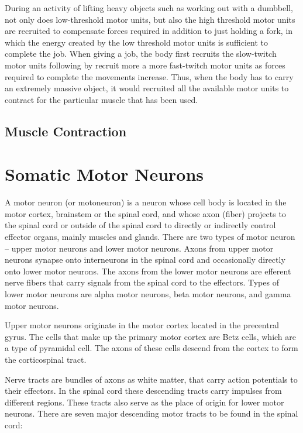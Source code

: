 During an activity of lifting heavy objects such as working out with a dumbbell, not only does low-threshold motor units, but also the high threshold motor units are recruited to compensate forces required in addition to just holding a fork, in which the energy created by the low threshold motor units is sufficient to complete the job. When giving a job, the body first recruits the slow-twitch motor units following by recruit more a more fast-twitch motor units as forces required to complete the movements increase. Thus, when the body has to carry an extremely massive object, it would recruited all the available motor units to contract for the particular muscle that has been used.

\hypertarget{muscle-contraction}{%
\subsection{Muscle Contraction}\label{muscle-contraction}}

\hypertarget{somatic-motor-neurons}{%
\section{Somatic Motor Neurons}\label{somatic-motor-neurons}}

A motor neuron (or motoneuron) is a neuron whose cell body is located in the motor cortex, brainstem or the spinal cord, and whose axon (fiber) projects to the spinal cord or outside of the spinal cord to directly or indirectly control effector organs, mainly muscles and glands. There are two types of motor neuron -- upper motor neurons and lower motor neurons. Axons from upper motor neurons synapse onto interneurons in the spinal cord and occasionally directly onto lower motor neurons. The axons from the lower motor neurons are efferent nerve fibers that carry signals from the spinal cord to the effectors. Types of lower motor neurons are alpha motor neurons, beta motor neurons, and gamma motor neurons.

Upper motor neurons originate in the motor cortex located in the precentral gyrus. The cells that make up the primary motor cortex are Betz cells, which are a type of pyramidal cell. The axons of these cells descend from the cortex to form the corticospinal tract.

Nerve tracts are bundles of axons as white matter, that carry action potentials to their effectors. In the spinal cord these descending tracts carry impulses from different regions. These tracts also serve as the place of origin for lower motor neurons. There are seven major descending motor tracts to be found in the spinal cord:

